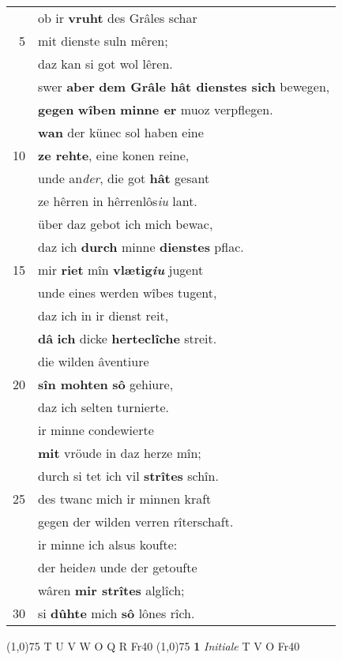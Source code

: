 \documentclass[8pt,a4paper,notitlepage]{article}
\begin{document}
\begin{table}[ht]
\begin{minipage}[t]{0.5\linewidth}
\begin{tabular}{rl}
 & ob ir \textbf{vruht} des Grâles schar\\ 
5 & mit dienste suln mêren;\\ 
 & daz kan si got wol lêren.\\ 
 & swer \textbf{aber} \textbf{dem Grâle hât dienstes sich} bewegen,\\ 
 & \textbf{gegen} \textbf{wîben} \textbf{minne er} muoz verpflegen.\\ 
 & \textbf{wan} der künec sol haben eine\\ 
10 & \textbf{ze rehte}, eine konen reine,\\ 
 & unde an\textit{der}, die got \textbf{hât} gesant\\ 
 & ze hêrren in hêrrenlôs\textit{iu} lant.\\ 
 & über daz gebot ich mich bewac,\\ 
 & daz ich \textbf{durch} minne \textbf{dienstes} pflac.\\ 
15 & mir \textbf{riet} mîn \textbf{vlætig\textit{iu}} jugent\\ 
 & unde eines werden wîbes tugent,\\ 
 & daz ich in ir dienst reit,\\ 
 & \textbf{dâ} \textbf{ich} dicke \textbf{herteclîche} streit.\\ 
 & die wilden âventiure\\ 
20 & \textbf{sîn mohten} \textbf{sô} gehiure,\\ 
 & daz ich selten turnierte.\\ 
 & ir minne condewierte\\ 
 & \textbf{mit} vröude in daz herze mîn;\\ 
 & durch si tet ich vil \textbf{strîtes} schîn.\\ 
25 & des twanc mich ir minnen kraft\\ 
 & gegen der wilden verren rîterschaft.\\ 
 & ir minne ich alsus koufte:\\ 
 & der heide\textit{n} unde der getoufte\\ 
 & wâren \textbf{mir strîtes} alglîch;\\ 
30 & si \textbf{dûhte} mich \textbf{sô} lônes rîch.\\ 
\end{tabular}
\scriptsize
\line(1,0){75} \newline
T U V W O Q R Fr40 \newline
\line(1,0){75} \newline
\textbf{1} \textit{Initiale} T V O Fr40  \newline

\end{minipage}
\end{table}
\end{document}
